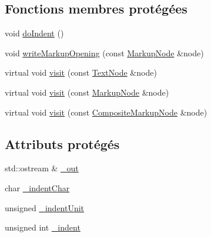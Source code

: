 \subsection*{Fonctions membres protégées}
\begin{DoxyCompactItemize}
\item 
void \hyperlink{classxml_1_1_output_visitor_af369ea5f7984975e7dfdea89ddcae000}{doIndent} ()
\item 
void \hyperlink{classxml_1_1_output_visitor_a4008bcf393c484232ae20cc7dc97c0f0}{writeMarkupOpening} (const \hyperlink{classxml_1_1_markup_node}{MarkupNode} \&node)
\item 
virtual void \hyperlink{classxml_1_1_output_visitor_a33e53f866b31a155bbf29ffda852aaf7}{visit} (const \hyperlink{classxml_1_1_text_node}{TextNode} \&node)
\item 
virtual void \hyperlink{classxml_1_1_output_visitor_ac1dae5dbb561c4b7e98a761d5d503e49}{visit} (const \hyperlink{classxml_1_1_markup_node}{MarkupNode} \&node)
\item 
virtual void \hyperlink{classxml_1_1_output_visitor_addfc73ae3643a8285b5f892eff1a6066}{visit} (const \hyperlink{classxml_1_1_composite_markup_node}{CompositeMarkupNode} \&node)
\end{DoxyCompactItemize}
\subsection*{Attributs protégés}
\begin{DoxyCompactItemize}
\item 
std::ostream \& \hyperlink{classxml_1_1_output_visitor_ab2e31d8a9675f88d96a89399ea894e83}{\_\-out}
\item 
char \hyperlink{classxml_1_1_output_visitor_a9b89adad1ba1e3ff2f64ad7cd6545361}{\_\-indentChar}
\item 
unsigned \hyperlink{classxml_1_1_output_visitor_a55060d8246a1365089872aa4a500b03c}{\_\-indentUnit}
\item 
unsigned int \hyperlink{classxml_1_1_output_visitor_a7664b7975557ab6db96b744bf43190f4}{\_\-indent}
\end{DoxyCompactItemize}
